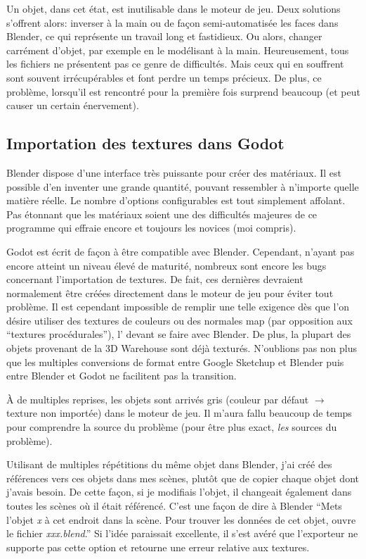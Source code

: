 Un objet, dans cet état, est inutilisable dans le moteur de jeu. Deux solutions s'offrent alors: inverser à la main ou de façon semi-automatisée les faces dans Blender, ce qui représente un travail long et fastidieux. Ou alors, changer carrément d'objet, par exemple en le modélisant à la main. Heureusement, tous les fichiers ne présentent pas ce genre de difficultés. Mais ceux qui en souffrent  sont souvent irrécupérables et font perdre un temps précieux. De plus, ce problème, lorsqu'il est rencontré pour la première fois surprend beaucoup (et peut causer un certain énervement).


\subsection{Importation des textures dans Godot}
Blender dispose d'une interface très puissante pour créer des matériaux. Il est possible d'en inventer une grande quantité, pouvant ressembler à n'importe quelle matière réelle. Le nombre d'options configurables est tout simplement affolant. Pas étonnant que les matériaux soient une des difficultés majeures de ce programme qui effraie encore et toujours les novices (moi compris).

Godot est écrit de façon à être compatible avec Blender. Cependant, n'ayant pas encore atteint un niveau élevé de maturité, nombreux sont encore les bugs concernant l'importation de textures. De fait, ces dernières devraient normalement être créées directement dans le moteur de jeu pour éviter tout problème. Il est cependant impossible de remplir une telle exigence dès que l'on désire utiliser des textures de couleurs ou des normales map (par opposition aux \enquote{textures procédurales}), l' devant se faire avec Blender. De plus, la plupart des objets provenant de la 3D Warehouse sont déjà texturés. N'oublions pas non plus que les multiples conversions de format entre Google Sketchup et Blender puis entre Blender et Godot ne facilitent pas la transition.

À de multiples reprises, les objets sont arrivés gris (couleur par défaut $\rightarrow$ texture non importée) dans le moteur de jeu. Il m'aura fallu beaucoup de temps pour comprendre la source du problème (pour être plus exact, \textit{les} sources du problème).

Utilisant de multiples répétitions du même objet dans Blender, j'ai créé des références vers ces objets dans mes scènes, plutôt que de copier chaque objet dont j'avais besoin. De cette façon, si je modifiais l'objet, il changeait également dans toutes les scènes où il était référencé. C'est une façon de dire à Blender \enquote{Mets l'objet \textit{x} à cet endroit dans la scène. Pour trouver les données de cet objet, ouvre le fichier \textit{xxx.blend}.} Si l'idée paraissait excellente, il s'est avéré que l'exporteur ne supporte pas cette option et retourne une erreur relative aux textures.

